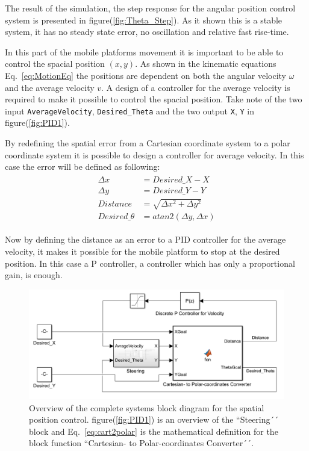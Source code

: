 The result of the simulation, the step response for the angular position control system is presented in figure(\ref{fig:Theta_Step}).
As it shown this is a stable system, it has no steady state error, no oscillation and relative fast rise-time.

In this part of the mobile platforms movement it is important to be able to control the spacial position $(x, y)$. 
As shown in the kinematic equations Eq.~\eqref{eq:MotionEq} the positions are dependent on both the angular velocity $\omega$ and the average velocity $v$. 
A design of a controller for the average velocity is required to make it possible to control the spacial position. 
Take note of the two input \texttt{AverageVelocity}, \texttt{Desired\_Theta} and the two output \texttt{X}, \texttt{Y} in figure(\ref{fig:PID1}).

By redefining the spatial error from a Cartesian coordinate system to a polar coordinate system it is possible to design a controller for average velocity.
In this case the error will be defined as following:
\begin{eqnarray}
\begin{aligned}
\Delta x &= Desired\_X - X\\
\Delta y &= Desired\_Y - Y\\
Distance &= \sqrt{\Delta x^2 + \Delta y^2}\\
Desired\_\theta &= atan2(\Delta y, \Delta x)
\end{aligned}
\label{eq:cart2polar}
\end{eqnarray}

Now by defining the distance as an error to a PID controller for the average velocity, it makes it possible for the mobile platform to stop at the desired position. 
In this case a P controller, a controller which has only a proportional gain, is enough.
\begin{figure}[ht]
\centering
\includegraphics[width=\textwidth]{sections/assets/V_PID.PNG}
\caption{Overview of the complete systems block diagram for the spatial position control. figure(\ref{fig:PID1}) is an overview of the ``Steering´´ block and Eq.~\eqref{eq:cart2polar} is the mathematical definition for the block function ``Cartesian- to Polar-coordinates Converter´´.}
\label{fig:V_PID}
\end{figure}
 
